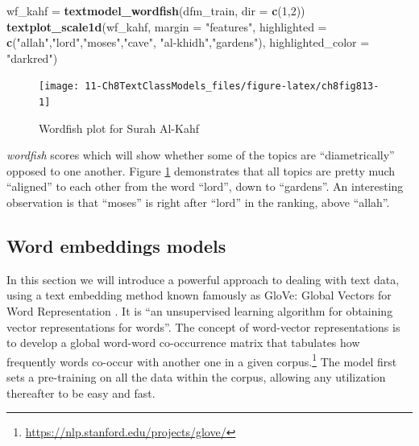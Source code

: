 \documentclass[
]{article}
\newenvironment{Shaded}{\begin{snugshade}}{\end{snugshade}}
\newcommand{\AttributeTok}[1]{\textcolor[rgb]{0.13,0.29,0.53}{#1}}
\newcommand{\DecValTok}[1]{\textcolor[rgb]{0.00,0.00,0.81}{#1}}
\newcommand{\FunctionTok}[1]{\textcolor[rgb]{0.13,0.29,0.53}{\textbf{#1}}}
\newcommand{\NormalTok}[1]{#1}
\newcommand{\OtherTok}[1]{\textcolor[rgb]{0.56,0.35,0.01}{#1}}
\newcommand{\StringTok}[1]{\textcolor[rgb]{0.31,0.60,0.02}{#1}}
\begin{document}
\begin{Shaded}
\begin{Highlighting}[]
\NormalTok{wf\_kahf }\OtherTok{=} \FunctionTok{textmodel\_wordfish}\NormalTok{(dfm\_train, }\AttributeTok{dir =} \FunctionTok{c}\NormalTok{(}\DecValTok{1}\NormalTok{,}\DecValTok{2}\NormalTok{))}
\FunctionTok{textplot\_scale1d}\NormalTok{(wf\_kahf, }\AttributeTok{margin =} \StringTok{"features"}\NormalTok{,}
                 \AttributeTok{highlighted =} \FunctionTok{c}\NormalTok{(}\StringTok{"allah"}\NormalTok{,}\StringTok{"lord"}\NormalTok{,}\StringTok{"moses"}\NormalTok{,}\StringTok{"cave"}\NormalTok{,}
                                 \StringTok{"al{-}khidh"}\NormalTok{,}\StringTok{"gardens"}\NormalTok{),}
                 \AttributeTok{highlighted\_color =} \StringTok{"darkred"}\NormalTok{)}
\end{Highlighting}
\end{Shaded}

\begin{figure}

{\centering \texttt{[image: 11-Ch8TextClassModels\_files/figure-latex/ch8fig813-1]} 

}

\caption{Wordfish plot for Surah Al-Kahf}\label{fig:ch8fig813}
\end{figure}

\emph{wordfish} scores which will show whether some of the topics are ``diametrically'' opposed to one another. Figure \ref{fig:ch8fig813} demonstrates that all topics are pretty much ``aligned'' to each other from the word ``lord'', down to ``gardens''. An interesting observation is that ``moses'' is right after ``lord'' in the ranking, above ``allah''.

\hypertarget{word-embedding-models}{%
\subsection{Word embeddings models}\label{word-embedding-models}}

In this section we will introduce a powerful approach to dealing with text data, using a text embedding method known famously as GloVe: Global Vectors for Word Representation \citep{glove2014}. It is ``an unsupervised learning algorithm for obtaining vector representations for words''. The concept of word-vector representations is to develop a global word-word co-occurrence matrix that tabulates how frequently words co-occur with another one in a given corpus.\footnote{\url{https://nlp.stanford.edu/projects/glove/}} The model first sets a pre-training on all the data within the corpus, allowing any utilization thereafter to be easy and fast.
\end{document}

